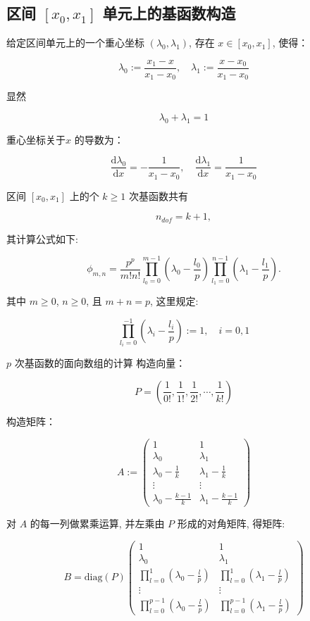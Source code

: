 \documentclass{article}
\begin{document}
\subsection{区间 $ [x_0, x_1] $ 单元上的基函数构造}

给定区间单元上的一个重心坐标 $(\lambda_0, \lambda_1)$, 存在
$ x \in [x_0, x_1]$, 使得：

\[
\lambda_0 := \frac{x_1 - x}{x_1 - x_0}, \quad
\lambda_1 := \frac{x  - x_0}{x_1 - x_0}
\]

显然 

\[
\lambda_0 + \lambda_1 = 1
\]

重心坐标关于$ x $ 的导数为：

\[
\frac{\mathrm d \lambda_0}{\mathrm d x} = -\frac{1}{x_1 - x_0},\quad
\frac{\mathrm d \lambda_1}{\mathrm d x} = \frac{1}{x_1 - x_0}
\]

区间 $[x_0, x_1]$ 上的个 $ k\geq 1 $ 次基函数共有 

\[
n_{dof} = k+1,
\]

其计算公式如下:

\[
\phi_{m,n} = \frac{p^p}{m!n!}\prod_{l_0 = 0}^{m - 1}
(\lambda_0 - \frac{l_0}{p}) \prod_{l_1 = 0}^{n-1}(\lambda_1 -
\frac{l_1}{p}).
\]

其中 $ m\geq 0$, $ n\geq 0 $, 且 $ m+n=p $, 这里规定:

\[
 \prod_{l_i=0}^{-1}(\lambda_i - \frac{l_i}{p}) := 1,\quad i=0, 1
\]

$ p $ 次基函数的面向数组的计算
构造向量： 

\[
P = ( \frac{1}{0!},  \frac{1}{1!}, \frac{1}{2!}, \cdots, \frac{1}{k!})
\]

构造矩阵： 

\[
A :=
\begin{pmatrix}
1  &  1  \\
\lambda_0 & \lambda_1\\
\lambda_0 - \frac{1}{k} & \lambda_1 - \frac{1}{k}\\
\vdots & \vdots \\
\lambda_0 - \frac{k - 1}{k} & \lambda_1 - \frac{k - 1}{k}
\end{pmatrix}
\]

对 $ A $ 的每一列做累乘运算, 并左乘由 \(P\) 形成的对角矩阵, 得矩阵:

\[
B = \mathrm{diag}(P)
\begin{pmatrix}
1 & 1\\
\lambda_0 & \lambda_1\\
\prod_{l=0}^{1}(\lambda_0 - \frac{l}{p}) & \prod_{l=0}^{1}(\lambda_1 - \frac{l}{p})\\
\vdots & \vdots \\
\prod_{l=0}^{p-1}(\lambda_0 - \frac{l}{p}) & \prod_{l=0}^{p-1}(\lambda_1 - \frac{l}{p})
\end{pmatrix}
\]
\end{document}
